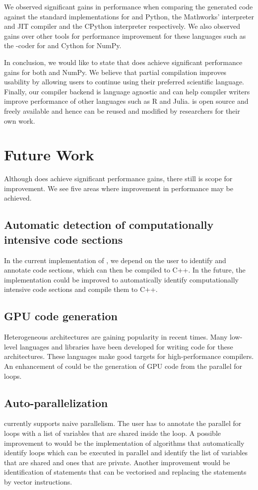We observed significant gains in performance when comparing the generated code against the standard implementations for \matlab and Python, the Mathworks' \matlab interpreter and JIT compiler and the CPython interpreter respectively. We also observed gains over other tools for performance improvement for these languages such as the \matlab-coder for \matlab and Cython for NumPy.  

In conclusion, we would like to state that \velocty does achieve significant performance gains for both \matlab and NumPy. We believe that partial compilation improves usability by allowing users to continue using their preferred scientific language. Finally, our compiler backend is language agnostic and can help compiler writers improve performance of other languages such as R and Julia. \velocty is open source and freely available and hence can be reused and modified by researchers for their own work. 

\section{Future Work}
Although \velocty does achieve significant performance gains, there still is scope for improvement. We see five areas where improvement in performance may be achieved.
\subsection{Automatic detection of computationally intensive code sections}
In the current implementation of \velocty, we depend on the user to identify and annotate code sections, which can then be compiled to C++. In the future, the implementation could be improved to automatically identify computationally intensive code sections and compile them to C++. 
\subsection{GPU code generation}
Heterogeneous architectures are gaining popularity in recent times. Many low-level languages and libraries have been developed for writing code for these architectures. These languages make good targets for high-performance compilers. An enhancement of \velocty could be the generation of GPU code from the parallel for loops. 
\subsection{Auto-parallelization}
\velocty currently supports naive parallelism. The user has to annotate the parallel for loops with a list of variables that are shared inside the loop. A possible improvement to \velocty would be the implementation of algorithms that automatically identify loops which can be executed in parallel and identify the list of variables that are shared and ones that are private. Another improvement would be identification of statements that can be vectorised and replacing the statements by vector instructions. 

